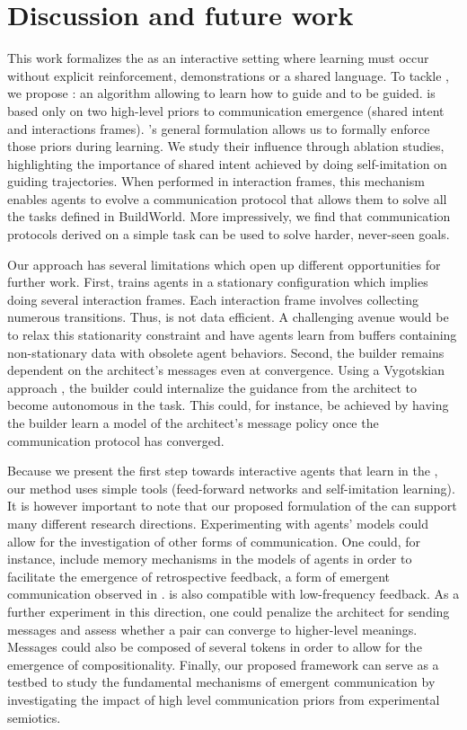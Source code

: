 \section{Discussion and future work}
This work formalizes the \abp as an interactive setting where learning must occur without explicit reinforcement, demonstrations or a shared language. To tackle \abp, we propose \abig: an algorithm allowing to learn how to guide and to be guided. \abim is based only on two high-level priors to communication emergence (shared intent and interactions frames). \abp's general formulation allows us to formally enforce those priors during learning. We study their influence through ablation studies, highlighting the importance of shared intent achieved by doing self-imitation on guiding trajectories. When performed in interaction frames, this mechanism enables agents to %
evolve a communication protocol that allows them to solve all the tasks defined in BuildWorld. More impressively, we find that communication protocols derived on a simple task can be used to solve harder, never-seen goals.

Our approach has several limitations which open up different opportunities for further work. First, \abim trains agents in a stationary configuration which implies doing several interaction frames. Each interaction frame involves collecting numerous transitions. Thus, \abim is not data efficient.  A challenging avenue would be to relax this stationarity constraint and have agents learn from buffers containing non-stationary data with obsolete agent behaviors. Second, the builder remains dependent on the architect's messages even at convergence. Using a Vygotskian approach \citep{imagine,colas:hal-03159786}, the builder could internalize the guidance from the architect to become autonomous in the task. This could, for instance, be achieved by having the builder learn a model of the architect's message policy once the communication protocol has converged. 

Because we present the first step towards interactive agents that learn in the \abp, our method uses simple tools (feed-forward networks and self-imitation learning). It is however important to note that our proposed formulation of the \abp can support many different research directions. Experimenting with agents' models could allow for the investigation of other forms of communication. One could, for instance, include memory mechanisms in the models of agents in order to facilitate the emergence of retrospective feedback, a form of emergent communication observed in \citep{vollmer2014studying}. \abp is also compatible with low-frequency feedback. As a further experiment in this direction, one could penalize the architect for sending messages and assess whether a pair can converge to higher-level meanings. Messages could also be composed of several tokens in order to allow for the emergence of compositionality. Finally, our proposed framework can serve as a testbed to study the fundamental mechanisms of emergent communication by investigating the impact of high level communication priors from experimental semiotics. 

